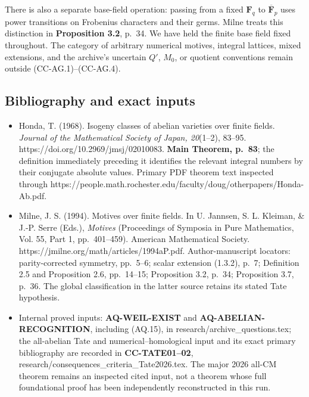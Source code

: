 There is also a separate base-field operation: passing from a fixed
\(\mathbf F_q\) to \(\overline{\mathbf F}_p\) uses power transitions on
Frobenius characters and their germs. Milne treats this distinction in
\textbf{Proposition 3.2}, p.~34. We have held the finite base field
fixed throughout. The category of arbitrary numerical motives, integral
lattices, mixed extensions, and the archive's uncertain \(Q'\), \(M_0\),
or quotient conventions remain outside (CC-AG.1)--(CC-AG.4).

\subsection{Bibliography and exact
inputs}\label{bibliography-and-exact-inputs}

\begin{itemize}
\tightlist
\item
  Honda, T. (1968). Isogeny classes of abelian varieties over finite
  fields. \emph{Journal of the Mathematical Society of Japan, 20}(1--2),
  83--95. https://doi.org/10.2969/jmsj/02010083. \textbf{Main Theorem,
  p.~83}; the definition immediately preceding it identifies the
  relevant integral numbers by their conjugate absolute values. Primary
  PDF theorem text inspected through
  https://people.math.rochester.edu/faculty/doug/otherpapers/Honda-Ab.pdf.
\item
  Milne, J. S. (1994). Motives over finite fields. In U. Jannsen, S. L.
  Kleiman, \& J.-P. Serre (Eds.), \emph{Motives} (Proceedings of
  Symposia in Pure Mathematics, Vol. 55, Part 1, pp.~401--459). American
  Mathematical Society. https://jmilne.org/math/articles/1994aP.pdf.
  Author-manuscript locators: parity-corrected symmetry, pp.~5--6;
  scalar extension (1.3.2), p.~7; Definition 2.5 and Proposition 2.6,
  pp.~14--15; Proposition 3.2, p.~34; Proposition 3.7, p.~36. The global
  classification in the latter source retains its stated Tate
  hypothesis.
\item
  Internal proved inputs: \textbf{AQ-WEIL-EXIST} and
  \textbf{AQ-ABELIAN-RECOGNITION}, including (AQ.15), in
  research/archive\_questions.tex; the all-abelian Tate and
  numerical--homological input and its exact primary bibliography are
  recorded in \textbf{CC-TATE01--02},
  research/consequences\_criteria\_Tate2026.tex. The major 2026 all-CM
  theorem remains an inspected cited input, not a theorem whose full
  foundational proof has been independently reconstructed in this run.
\end{itemize}
